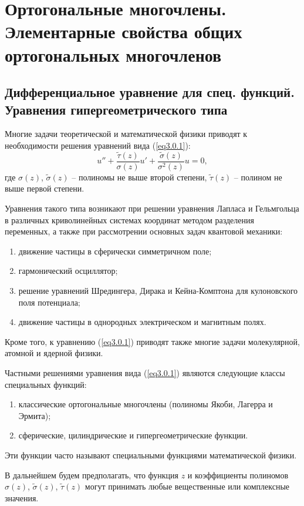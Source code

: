\section{Ортогональные многочлены.
Элементарные свойства общих ортогональных многочленов}

\subsection{Дифференциальное уравнение для спец. функций.
Уравнения гипергеометрического типа}

Многие задачи теоретической и математической физики приводят к необходимости
решения уравнений вида (\ref{eq3.0.1}):
\begin{equation}
    u'' + \frac{\tilde{\tau}(z)}{\sigma(z)}u' +
    \frac{\tilde{\sigma}(z)}{\sigma^2(z)}u = 0,
    \label{eq3.0.1}
\end{equation}
где \( \sigma(z) \), \( \tilde{\sigma}(z) \) -- полиномы не выше второй степени,
\( \tilde{\tau}(z) \) -- полином не выше первой степени.

Уравнения такого типа возникают при решении уравнения Лапласа и Гельмгольца в
различных криволинейных системах координат методом разделения переменных,
а также при рассмотрении основных задач квантовой механики: 
\begin{enumerate}
    \item движение частицы в сферически симметричном поле;
    \item гармонический осциллятор;
    \item решение уравнений Шредингера, Дирака и Кейна-Комптона для кулоновского
    поля потенциала;
    \item движение частицы в однородных электрическом и магнитным полях.
\end{enumerate}
Кроме того, к уравнению (\ref{eq3.0.1}) приводят также многие задачи
молекулярной, атомной и ядерной физики.

Частными решениями уравнения вида (\ref{eq3.0.1}) являются следующие классы
специальных функций:
\begin{enumerate}
    \item классические ортогональные многочлены (полиномы Якоби, Лагерра и 
    Эрмита);
    \item сферические, цилиндрические и гипергеометрические функции.
\end{enumerate}
Эти функции часто называют специальными функциями математической физики.

В дальнейшем будем предполагать, что функция \( z \) и коэффициенты полиномов
\( \sigma(z) \), \( \tilde{\sigma}(z) \), \( \tilde{\tau}(z) \) могут принимать
любые вещественные или комплексные значения.

